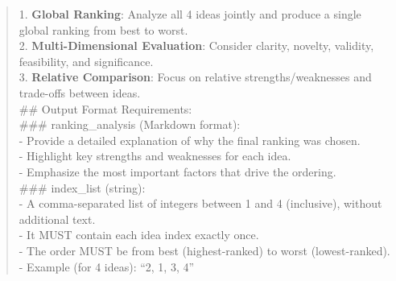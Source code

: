 \begin{quote}
\begin{tcolorbox}[breakable,colback=report!20!white, colframe=report!60!black, title=\textbf{Prompt for Report Agent (Group Ranking)}]
        1. \textbf{Global Ranking}: Analyze all 4 ideas jointly and produce a single global ranking from best to worst.\\
        2. \textbf{Multi-Dimensional Evaluation}: Consider clarity, novelty, validity, feasibility, and significance.\\
        3. \textbf{Relative Comparison}: Focus on relative strengths/weaknesses and trade-offs between ideas.\\
        
        \#\# Output Format Requirements:\\
        
        \#\#\# ranking\_analysis (Markdown format):\\
        - Provide a detailed explanation of why the final ranking was chosen.\\
        - Highlight key strengths and weaknesses for each idea.\\
        - Emphasize the most important factors that drive the ordering.\\
        
        \#\#\# index\_list (string):\\
        - A comma-separated list of integers between 1 and 4 (inclusive), without additional text.\\
        - It MUST contain each idea index exactly once.\\
        - The order MUST be from best (highest-ranked) to worst (lowest-ranked).\\
        - Example (for 4 ideas): ``2, 1, 3, 4''
    \end{tcolorbox}
    
\end{quote}